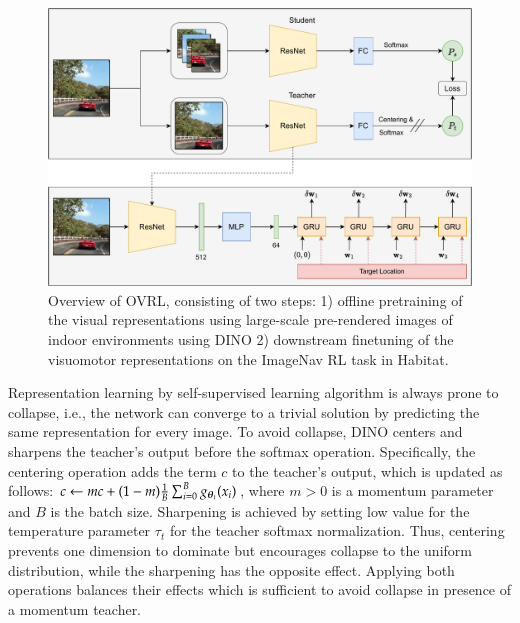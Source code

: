 \documentclass[12pt, letterpaper,cleardoubleempty,BCOR1cm]{scrbook}
\begin{document}
\begin{figure}[htbp]
\centering
\includegraphics[keepaspectratio,width=\textwidth,height=\textheight]{./img/ovrl.pdf}
\caption{\label{fig:orga4bf381}Overview of OVRL, consisting of two steps: 1) offline pretraining of the visual representations using large-scale pre-rendered images of indoor environments using DINO 2) downstream finetuning of the visuomotor representations on the ImageNav RL task in Habitat.}
\end{figure}


Representation learning by self-supervised learning algorithm is always prone to
collapse, i.e., the network can converge to a trivial solution by predicting the
same representation for every image. To avoid collapse, DINO centers and
sharpens the teacher’s output before the softmax operation. Specifically, the
centering operation adds the term \(c\) to the teacher’s output, which is
updated as follows: \(c\leftarrow mc+(1-m)\frac1B\sum_{i=0}^{B}g_{\boldsymbol{\theta}_{t}}(x_{i})\),
where \(m>0\) is a momentum parameter and \(B\) is the batch size. Sharpening is
achieved by setting low value for the temperature parameter \(\tau_{t}\) for the
teacher softmax normalization. Thus, centering prevents one dimension to
dominate but encourages collapse to the uniform distribution, while the
sharpening has the opposite effect. Applying both operations balances their
effects which is sufficient to avoid collapse in presence of a momentum teacher.
\end{document}
